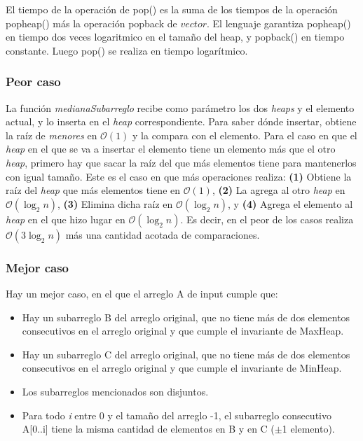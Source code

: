 \documentclass[spanish,a4paper]{article}
\begin{document}
El tiempo de la operación de pop() es la suma de los tiempos de la operación pop\textunderscore heap() más la operación pop\textunderscore back de $vector$. El lenguaje garantiza pop\textunderscore heap() en tiempo dos veces logaritmico en el tamaño del heap, y pop\textunderscore back() en tiempo constante. Luego pop() se realiza en tiempo logarítmico.




\subsubsection{Peor caso}

La función \textit{medianaSubarreglo} recibe como parámetro los dos \textit{heaps} y el elemento actual, y lo inserta en el \textit{heap} correspondiente. Para saber dónde insertar, obtiene la raíz de \textit{menores} en $\mathcal{O}(1)$ y la compara con el elemento. Para el caso en que el \textit{heap} en el que se va a insertar el elemento tiene un elemento más que el otro \textit{heap}, primero hay que sacar la raíz del que más elementos tiene para mantenerlos con igual tamaño. Este es el caso en que más operaciones realiza: \textbf{(1)} Obtiene la raíz del \textit{heap} que más elementos tiene en $\mathcal{O}(1)$, \textbf{(2)} La agrega al otro \textit{heap} en $\mathcal{O}(\log_2 n)$, \textbf{(3)} Elimina dicha raíz en $\mathcal{O}(\log_2 n)$, y \textbf{(4)} Agrega el elemento al \textit{heap} en el que hizo lugar en $\mathcal{O}(\log_2 n)$. Es decir, en el peor de los casos realiza $\mathcal{O}(3 \log_2 n)$ más una cantidad acotada de comparaciones.



\subsubsection{Mejor caso}
Hay un mejor caso, en el que el arreglo A de input cumple que:

\begin{itemize}
\item Hay un subarreglo B del arreglo original, que no tiene más de dos elementos consecutivos en el arreglo original y que cumple el invariante de MaxHeap.
\item Hay un subarreglo C del arreglo original, que no tiene más de dos elementos consecutivos en el arreglo original y que cumple el invariante de MinHeap.
\item Los subarreglos mencionados son disjuntos.
\item Para todo \textit{i} entre 0 y el tamaño del arreglo -1, el subarreglo consecutivo A[0..i] tiene la misma cantidad de elementos en B y en C ($\pm$1 elemento).
\end{itemize}
\end{document}
